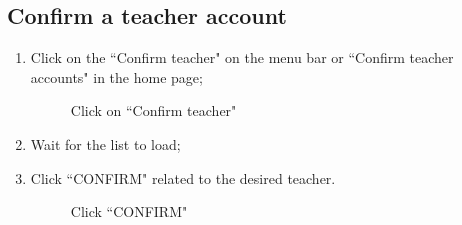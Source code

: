 \documentclass[ManualeUtente]{subfiles}
\begin{document}
\subsection{Confirm a teacher account}
\begin{enumerate}
	\item Click on the \textquotedblleft Confirm teacher" on the menu bar or \textquotedblleft Confirm teacher accounts" in the home page;
	\begin{figure}[H]
		\centering
		\caption{Click on ``Confirm teacher"}
		\label{fig:Click on "Confirm teacher"}
	\end{figure}
	\item Wait for the list to load;
	\item Click \textquotedblleft CONFIRM" related to the desired teacher.
	\begin{figure}[H]
		\centering
		\caption{Click ``CONFIRM"}
		\label{fig:Click "CONFIRM"}
	\end{figure}
\end{enumerate}
\end{document}
